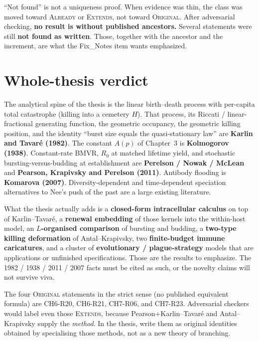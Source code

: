 \documentclass[11pt,a4paper]{report}
\newcommand{\cls}[1]{\textsc{#1}}
\newcommand{\orig}{\cls{Original}}
\newcommand{\ext}{\cls{Extends}}
\newcommand{\alr}{\cls{Already}}
\begin{document}
\noindent
``Not found'' is not a uniqueness proof. When evidence was thin, the class
was moved toward \alr{} or \ext, not toward \orig. After adversarial
checking, \textbf{no result is without published ancestors.} Several
statements were still \textbf{not found as written}. Those, together with
the ancestor and the increment, are what the Fix\_Notes item wants
emphasized.

\chapter{Whole-thesis verdict}
\label{ch:verdict}

The analytical spine of the thesis is the linear birth--death process with
per-capita total catastrophe (killing into a cemetery \(H\)). That process,
its Riccati / linear-fractional generating function, the geometric
occupancy, the geometric killing position, and the identity ``burst size
equals the quasi-stationary law'' are \textbf{Karlin and Tavar\'e
(1982)}. The constant \(A(p)\) of Chapter~3 is \textbf{Kolmogorov
(1938)}. Constant-rate BMVR, \(R_0\) at matched lifetime yield, and
stochastic bursting-versus-budding at establishment are \textbf{Perelson /
Nowak / McLean} and \textbf{Pearson, Krapivsky and Perelson (2011)}.
Antibody flooding is \textbf{Komarova (2007)}. Diversity-dependent and
time-dependent speciation alternatives to Nee's push of the past are a
large existing literature.

What the thesis actually adds is a \textbf{closed-form intracellular
calculus} on top of Karlin--Tavar\'e, a \textbf{renewal embedding} of those
kernels into the within-host model, an \textbf{\(L\)-organised
comparison} of bursting and budding, a \textbf{two-type killing
deformation} of Antal--Krapivsky, two \textbf{finite-budget immune
caricatures}, and a cluster of \textbf{evolutionary / plague-strategy}
models that are applications or unfinished specifications. Those are the
results to emphasize. The 1982 / 1938 / 2011 / 2007 facts must be cited as
such, or the novelty claims will not survive viva.

The four \orig{} statements in the strict sense (no published equivalent
formula) are CH6-R20, CH6-R21, CH7-R06, and CH7-R23. Adversarial checkers
would label even those \ext, because Pearson+Karlin--Tavar\'e and
Antal--Krapivsky supply the \emph{method}. In the thesis, write them as
original identities obtained by specialising those methods, not as a new
theory of branching.
\end{document}
